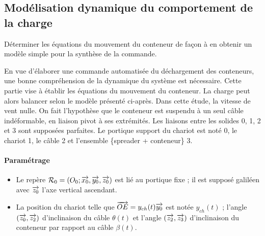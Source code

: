 \documentclass[10pt,fleqn]{article} %
\begin{document}
\def\pathfig{images}

\vspace{5cm}
\pagestyle{fancy}
\thispagestyle{plain}

\def\columnseprulecolor{\color{ocre}}
\setlength{\columnseprule}{0.4pt} 

\def\pathfig{images}

\ifprof
\else
\begin{multicols}{2}
\fi

\subsection*{Modélisation dynamique du comportement de la charge}

\begin{obj}
Déterminer les équations du mouvement du conteneur de façon à en obtenir un modèle simple pour
la synthèse de la commande.
\end{obj}
En vue d’élaborer une commande automatisée du déchargement des conteneurs, une bonne compréhension de
la dynamique du système est nécessaire. Cette partie vise à établir les équations du mouvement du conteneur.
La charge peut alors balancer selon le modèle présenté ci-après. Dans cette étude, la vitesse de vent nulle. On fait l'hypothèse que le conteneur est suspendu à un seul câble indéformable, en liaison pivot à ses extrémités. Les liaisons entre les solides 0, 1, 2 et 3 sont supposées parfaites.
Le portique support du chariot est noté 0, le chariot 1, le câble 2 et l’ensemble \{spreader + conteneur\} 3.

\paragraph*{Paramétrage}
\begin{itemize}
\item Le repère $\mathcal{R}_0=\left(O_0;\overrightarrow{x_0},\overrightarrow{y_0},\overrightarrow{z_0} \right)$ est lié au portique fixe ; il est supposé
galiléen avec $\overrightarrow{z_0}$ l’axe vertical ascendant.
\item La position du chariot telle que $\overrightarrow{OE} = y_{ch}(t) \overrightarrow{y_0}$ est notée $y_{ch}(t)$ ;
l’angle $\left(\overrightarrow{z_0},\overrightarrow{z_2}\right)$ d’inclinaison du câble $\theta(t)$ et l’angle $\left(\overrightarrow{z_2},\overrightarrow{z_3}\right)$ d’inclinaison
du conteneur par rapport au câble  $\beta(t)$.
\end{itemize}



\end{multicols}
\end{document}
